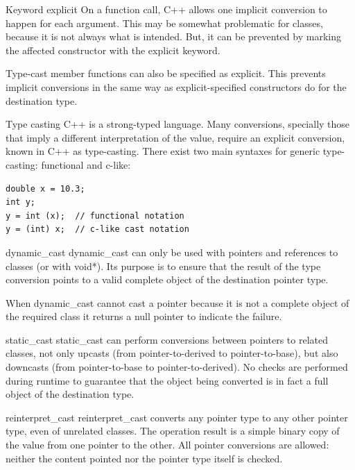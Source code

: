 \documentclass{beamer}
\begin{document}
\begin{frame}{Keyword explicit}
On a function call, C++ allows one implicit conversion to happen for each
argument. This may be somewhat problematic for classes, because it is not always
what is intended. But, it can be prevented by marking the affected constructor
with the explicit keyword.

Type-cast member functions can also be specified as explicit. This prevents
implicit conversions in the same way as explicit-specified constructors do for
the destination type.
\end{frame}

\begin{frame}[fragile]{Type casting}
C++ is a strong-typed language. Many conversions, specially those that imply a
different interpretation of the value, require an explicit conversion, known in
C++ as type-casting. There exist two main syntaxes for generic type-casting:
functional and c-like:
\begin{lstlisting}
double x = 10.3;
int y;
y = int (x);  // functional notation
y = (int) x;  // c-like cast notation
\end{lstlisting}
\end{frame}

\begin{frame}{dynamic\_cast}
dynamic\_cast can only be used with pointers and references to classes
(or with void*). Its purpose is to ensure that the result of the type conversion points
to a valid complete object of the destination pointer type.

When dynamic\_cast cannot cast a pointer because it is not a complete object of
the required class it returns a null pointer to indicate the failure.
\end{frame}

\begin{frame}{static\_cast}
static\_cast can perform conversions between pointers to related classes, not
only upcasts (from pointer-to-derived to pointer-to-base), but also downcasts
(from pointer-to-base to pointer-to-derived). No checks are performed during
runtime to guarantee that the object being converted is in fact a full object of
the destination type.
\end{frame}

\begin{frame}{reinterpret\_cast}
reinterpret\_cast converts any pointer type to any other pointer type, even of
unrelated classes. The operation result is a simple binary copy of the value
from one pointer to the other. All pointer conversions are allowed: neither the
content pointed nor the pointer type itself is checked.
\end{frame}
\end{document}
